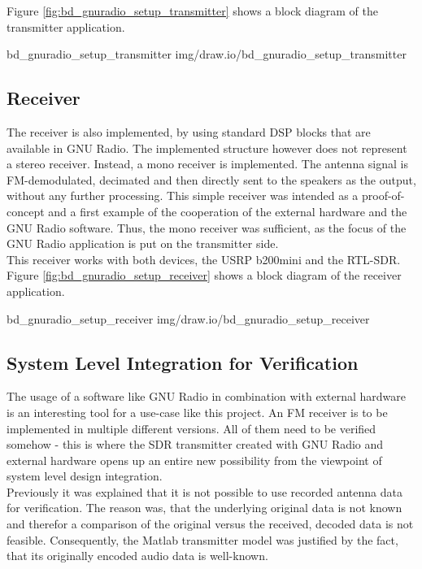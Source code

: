 \noindent
Figure \ref{fig:bd_gnuradio_setup_transmitter} shows a block diagram of the transmitter application.

 {bd_gnuradio_setup_transmitter} {img/draw.io/bd_gnuradio_setup_transmitter}


\subsection{Receiver}

The receiver is also implemented, by using standard DSP blocks that are available in GNU Radio.
The implemented structure however does not represent a stereo receiver.
Instead, a mono receiver is implemented.
The antenna signal is FM-demodulated, decimated and then directly sent to the speakers as the output, without any further processing.
This simple receiver was intended as a proof-of-concept and a first example of the cooperation of the external hardware and the GNU Radio software.
Thus, the mono receiver was sufficient, as the focus of the GNU Radio application is put on the transmitter side.\\

This receiver works with both devices, the USRP b200mini and the RTL-SDR.
Figure \ref{fig:bd_gnuradio_setup_receiver} shows a block diagram of the receiver application.

 {bd_gnuradio_setup_receiver} {img/draw.io/bd_gnuradio_setup_receiver}

\subsection{System Level Integration for Verification}

The usage of a software like GNU Radio in combination with external hardware is an interesting tool for a use-case like this project.
An FM receiver is to be implemented in multiple different versions.
All of them need to be verified somehow - this is where the SDR transmitter created with GNU Radio and external hardware opens up an entire new possibility from the viewpoint of system level design integration.\\

Previously it was explained that it is not possible to use recorded antenna data for verification.
The reason was, that the underlying original data is not known and therefor a comparison of the original versus the received, decoded data is not feasible.
Consequently, the Matlab transmitter model was justified by the fact, that its originally encoded audio data is well-known.\\

